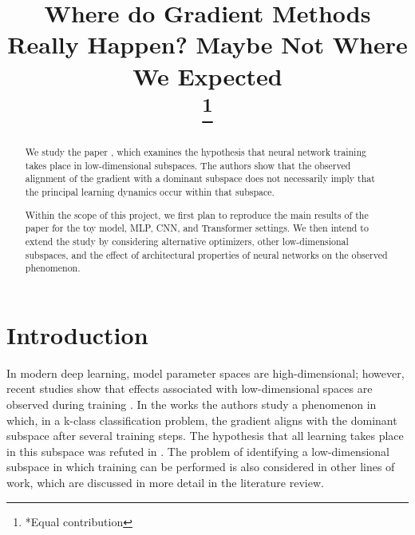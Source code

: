 \documentclass[conference]{IEEEtran}
\begin{document}
\title{Where do Gradient Methods Really Happen? Maybe Not Where We Expected\\
\thanks{*Equal contribution }
}

\author{
\and
{}
\and
{}
\and
{}
\and
{}
}

\maketitle

\begin{abstract}
We study the paper \citet{SongDoesSGD}, which examines the hypothesis that neural network training takes place in low-dimensional subspaces. The authors show that the observed alignment of the gradient with a dominant subspace does not necessarily imply that the principal learning dynamics occur within that subspace.

Within the scope of this project, we first plan to reproduce the main results of the paper for the toy model, MLP, CNN, and Transformer settings. We then intend to extend the study by considering alternative optimizers, other low-dimensional subspaces, and the effect of architectural properties of neural networks on the observed phenomenon.
\end{abstract} 

\section{Introduction}

In modern deep learning, model parameter spaces are high-dimensional; however, recent studies show that effects associated with low-dimensional spaces are observed during training \citep{GurAriGD, SongDoesSGD, LiDLDR}. In the works \citep{GurAriGD, SongDoesSGD} the authors study a phenomenon in which, in a k-class classification problem, the gradient aligns with the dominant subspace after several training steps. The hypothesis that all learning takes place in this subspace was refuted in \citet{SongDoesSGD}. The problem of identifying a low-dimensional subspace in which training can be performed is also considered in other lines of work, which are discussed in more detail in the literature review.
\end{document}
